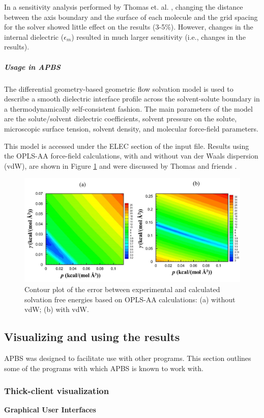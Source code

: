 \documentclass[11pt,titlepage]{article}
\begin{document}
In a sensitivity analysis performed by Thomas et. al. \cite{thomas2013}, changing the distance between the axis boundary and the surface of each molecule and the grid spacing for the solver showed little effect on the results (3-5$\%$). However, changes in the internal dielectric ($\epsilon_m$) resulted in much larger sensitivity (i.e., changes in the results).

\subparagraph{Usage in APBS}
The differential geometry-based geometric flow solvation model is used to describe a smooth dielectric interface profile across the solvent-solute boundary in a thermodynamically self-consistent fashion. The main parameters of the model are the solute/solvent dielectric coefficients, solvent pressure on the solute, microscopic surface tension, solvent density, and molecular force-field parameters.

This model is accessed under the ELEC section of the input file. Results using the OPLS-AA force-field calculations, with and without van der Waals dispersion (vdW), are shown in Figure \ref{fig:geoflow} and were discussed by Thomas and friends \cite{thomas2013}. 
%
\begin{figure}
	\centering
	\includegraphics[width=0.80\linewidth]{geoflow.png} 
	\caption{Contour plot of the error between experimental and calculated solvation free energies based on OPLS-AA calculations:  (a) without vdW;  (b) with vdW.}
	\label{fig:geoflow}
\end{figure}

\subsection{Visualizing and using the results}
APBS was designed to facilitate use with other programs. This section outlines some of the programs with which APBS is known to work with. 

\subsubsection{Thick-client visualization}
%
\textbf{Graphical User Interfaces} 
\end{document}
